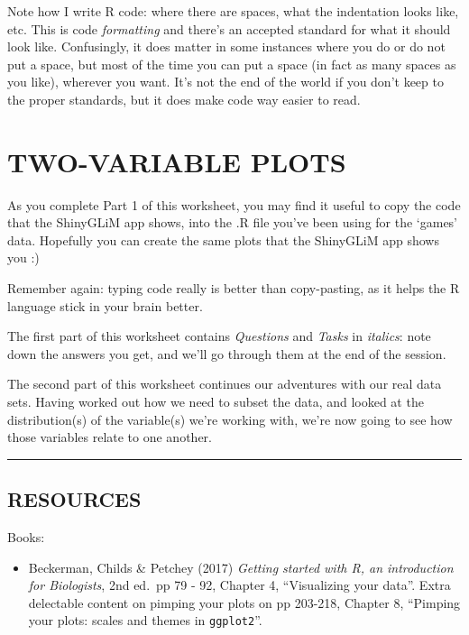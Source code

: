 \documentclass[
]{book}
\providecommand{\tightlist}{%
  \setlength{\itemsep}{0pt}\setlength{\parskip}{0pt}}
\begin{document}
Note how I write R code: where there are spaces, what the indentation looks like,
etc. This is code \emph{formatting} and there's an accepted standard for what it
should look like. Confusingly, it does matter in some instances where you do or
do not put a space, but most of the time you can put a space (in fact as many spaces
as you like), wherever you want. It's not the end of the world if you don't keep
to the proper standards, but it does make code way easier to read.

\hypertarget{two-variable-plots}{%
\chapter{TWO-VARIABLE PLOTS}\label{two-variable-plots}}

As you complete Part 1 of this worksheet, you may find it useful to copy the code that the ShinyGLiM
app shows, into the .R file you've been using for the `games' data. Hopefully
you can create the same plots that the ShinyGLiM app shows you :)

Remember again: typing code really is better than copy-pasting, as it helps the R language stick in your
brain better.

The first part of this worksheet contains \emph{Questions} and \emph{Tasks} in \emph{italics}: note
down the answers you get, and we'll go through them at the end of the session.

The second part of this worksheet continues our adventures with our real data sets.
Having worked out how we need to subset the data, and looked at the distribution(s)
of the variable(s) we're working with, we're now going to see how those variables
relate to one another.\\

\begin{center}\rule{0.5\linewidth}{\linethickness}\end{center}

\hypertarget{resources}{%
\section{RESOURCES}\label{resources}}

Books:

\begin{itemize}
\tightlist
\item
  Beckerman, Childs \& Petchey (2017) \emph{Getting started with R, an
  introduction for Biologists}, 2nd ed.~pp 79 - 92, Chapter 4, ``Visualizing
  your data''. Extra delectable content on pimping your plots on pp 203-218,
  Chapter 8, ``Pimping your plots: scales and themes in \texttt{ggplot2}''.
  ~
\end{itemize}
\end{document}
